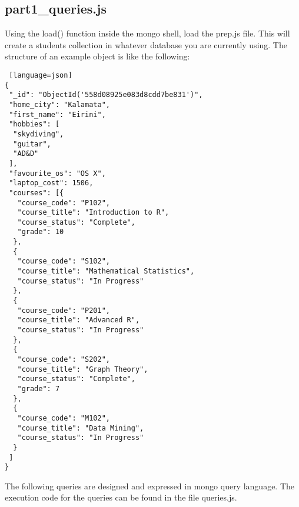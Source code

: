 \documentclass[11pt]{article}
\begin{document}
\subsection{part1\_queries.js}\label{part1queries.js}
Using the load() function inside the mongo shell, load the prep.js file. This will create a students collection in whatever database you are currently using. The structure of an example object is like the following:
\begin{lstlisting} [language=json]
{
 "_id": "ObjectId('558d08925e083d8cdd7be831')",
 "home_city": "Kalamata",
 "first_name": "Eirini",
 "hobbies": [
  "skydiving",
  "guitar",
  "AD&D"
 ],
 "favourite_os": "OS X",
 "laptop_cost": 1506,
 "courses": [{
   "course_code": "P102",
   "course_title": "Introduction to R",
   "course_status": "Complete",
   "grade": 10
  },
  {
   "course_code": "S102",
   "course_title": "Mathematical Statistics",
   "course_status": "In Progress"
  },
  {
   "course_code": "P201",
   "course_title": "Advanced R",
   "course_status": "In Progress"
  },
  {
   "course_code": "S202",
   "course_title": "Graph Theory",
   "course_status": "Complete",
   "grade": 7
  },
  {
   "course_code": "M102",
   "course_title": "Data Mining",
   "course_status": "In Progress"
  }
 ]
}
\end{lstlisting}
\noindent
The following queries are designed and expressed in mongo query language. The execution code for the queries can be found in the file queries.js.
\newline
\end{document}
